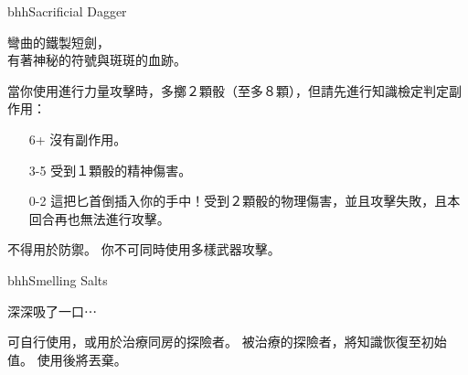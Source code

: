 %
\begin{ItemCard}{bhh}{Sacrificial Dagger}%
  \begin{CardStory}
    彎曲的鐵製短劍，\\
    有著神秘的符號與斑斑的血跡。
  \end{CardStory}
  當你使用\ThisName{}進行力量攻擊時，多擲２顆骰（至多８顆），但請先進行知識檢定判定副作用：
  \begin{itemize}
    \item[6+] 沒有副作用。
    \item[3-5] 受到１顆骰的精神傷害。
    \item[0-2] 這把匕首倒插入你的手中！受到２顆骰的物理傷害，並且攻擊失敗，且本回合再也無法進行攻擊。
  \end{itemize}
  \ThisName{}不得用於防禦。\smallskip
  你不可同時使用多樣武器攻擊。\smallskip
\end{ItemCard}%
%
\begin{ItemCard}{bhh}{Smelling Salts}
  \begin{CardStory}
    深深吸了一口⋯
  \end{CardStory}
  可自行使用，或用於治療同房的探險者。\smallskip
  被\ThisName{}治療的探險者，將知識恢復至初始值。\smallskip
  使用後將\ThisName{}丟棄。\smallskip
\end{ItemCard}%
